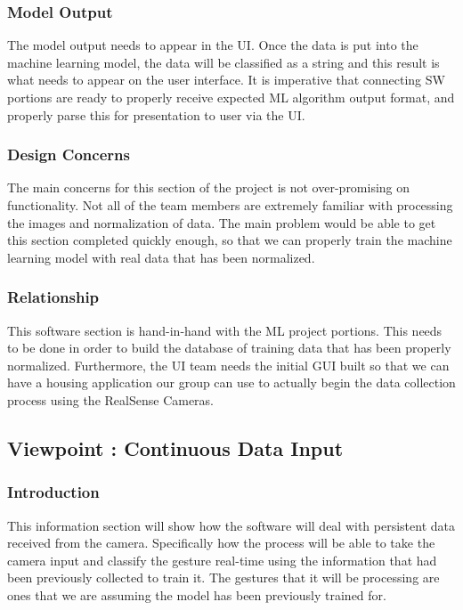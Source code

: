 \documentclass[onecolumn, draftclsnofoot,10pt, compsoc]{IEEEtran}
\begin{document}
\subsubsection{Model Output}
The model output needs to appear in the UI.
Once the data is put into the machine learning model, the data will be classified as a string and this result is what needs to appear on the user interface. It is imperative that connecting SW portions are ready to properly receive expected ML algorithm output format, and properly parse this for presentation to user via the UI.
\subsubsection{Design Concerns}
The main concerns for this section of the project is not over-promising on functionality. Not all of the team members are extremely familiar with  processing the images and normalization of data. The main problem would be able to get this section completed quickly enough, so that we can properly train the machine learning model with real data that has been normalized.

\subsubsection{Relationship}
This software section is hand-in-hand with the ML project portions. This needs to be done in order to build the database of training data that has been properly normalized. Furthermore, the UI team needs the initial GUI built so that we can have a housing application our group can use to actually begin the data collection process using the RealSense Cameras. 

\subsection{Viewpoint : Continuous Data Input}
\subsubsection{Introduction}
This information section will show how the software will deal with persistent data received from the camera. Specifically how the process will be able to take the camera input and classify the gesture real-time using the information that had been previously collected to train it. The gestures that it will be processing are ones that we are assuming the model has been previously trained for.
\end{document}
